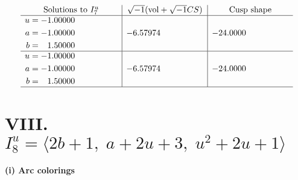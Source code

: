 \documentclass[1p]{elsarticle_modified}
\theoremstyle{definition}
\newcommand{\I}{\sqrt{-1}}
\begin{document}
$$\begin{array}{c|c|c}  
\text{Solutions to }I^u_{7}& \I (\text{vol} + \sqrt{-1}CS) & \text{Cusp shape}\\
 \hline 
\begin{aligned}
u &= -1.00000\phantom{ +0.000000I} \\
a &= -1.00000\phantom{ +0.000000I} \\
b &= \phantom{-}1.50000\phantom{ +0.000000I}\end{aligned}
 & -6.57974\phantom{ +0.000000I} & -24.0000\phantom{ +0.000000I} \\ \hline\begin{aligned}
u &= -1.00000\phantom{ +0.000000I} \\
a &= -1.00000\phantom{ +0.000000I} \\
b &= \phantom{-}1.50000\phantom{ +0.000000I}\end{aligned}
 & -6.57974\phantom{ +0.000000I} & -24.0000\phantom{ +0.000000I}\\
 \hline 
 \end{array}$$\newpage\newpage\renewcommand{\arraystretch}{1}
\centering \section*{VIII. $I^u_{8}= \langle 2 b+1,\;a+2 u+3,\;u^2+2 u+1 \rangle$}
\flushleft \textbf{(i) Arc colorings}\\
\end{document}
